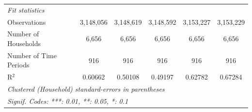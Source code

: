 \begin{table}[htbp]
\begin{tabular}{lccccc}
      \midrule
      \emph{Fit statistics}\\
      Observations                                 & 3,148,056      & 3,148,619      & 3,148,592       & 3,153,227       & 3,153,229\\  
      Number of Households               & 6,656          & 6,656          & 6,656           & 6,656           & 6,656\\  
      Number of Time Periods                       & 916            & 916            & 916             & 916             & 916\\  
      R$^2$                                        & 0.60662        & 0.50108        & 0.49197         & 0.62782         & 0.67284\\  
      \midrule \midrule
      \multicolumn{6}{l}{\emph{Clustered (Household) standard-errors in parentheses}}\\
      \multicolumn{6}{l}{\emph{Signif. Codes: ***: 0.01, **: 0.05, *: 0.1}}\\
   \end{tabular}
\end{table}


